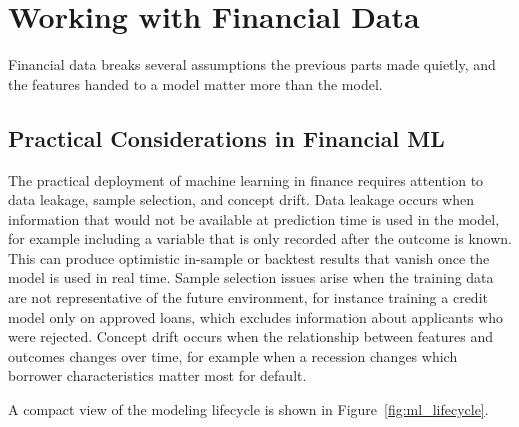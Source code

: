 \documentclass[../ai_in_finance]{subfiles}
\begin{document}
\section{Working with Financial Data}

Financial data breaks several assumptions the previous parts made quietly, and the features handed to a model matter more than the model.

\subsection{Practical Considerations in Financial ML}

The practical deployment of machine learning in finance requires attention to data leakage, sample selection, and concept drift. Data leakage occurs when information that would not be available at prediction time is used in the model, for example including a variable that is only recorded after the outcome is known. This can produce optimistic in-sample or backtest results that vanish once the model is used in real time. Sample selection issues arise when the training data are not representative of the future environment, for instance training a credit model only on approved loans, which excludes information about applicants who were rejected. Concept drift occurs when the relationship between features and outcomes changes over time, for example when a recession changes which borrower characteristics matter most for default.

A compact view of the modeling lifecycle is shown in Figure~\ref{fig:ml_lifecycle}.
\end{document}
